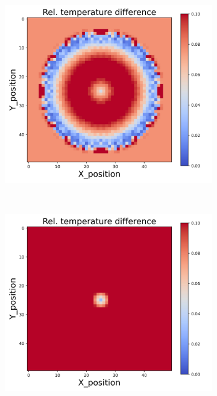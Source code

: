 \begin{figure}[h]
\begin{minipage}{\textwidth}
\begin{subfigure}{0.3\textwidth}
        \end{subfigure}
        \begin{subfigure}{0.3\textwidth}
            \centering
            \includegraphics[width=\textwidth]{figures/raw_data/31/lin_square/T_bias.jpg}
        \end{subfigure}
    \end{minipage}\\
    \begin{minipage}{\textwidth}
        \centering
        \begin{subfigure}{0.3\textwidth}
            \centering
            \includegraphics[width=\textwidth]{figures/raw_data/32/lin_square/T_bias.jpg}

\end{subfigure}
\end{minipage}
\end{figure}
